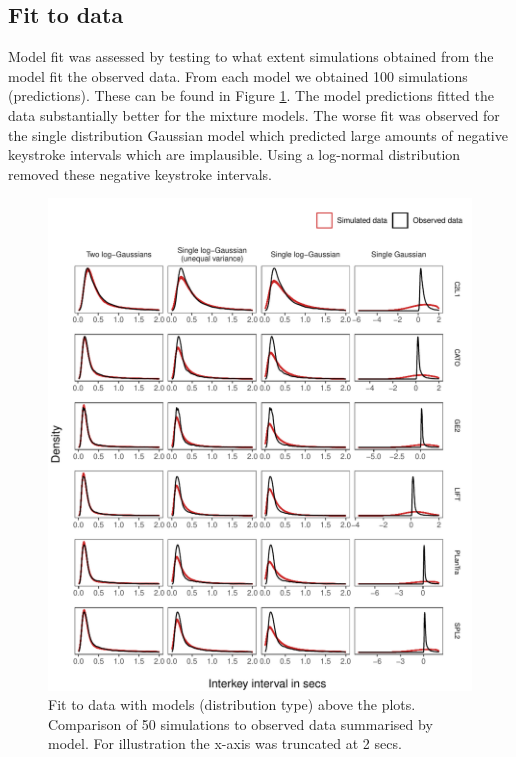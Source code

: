 \documentclass[
  english,
  man,floatsintext]{apa7}
\begin{document}
\clearpage
\makeatletter
\efloat@restorefloats
\makeatother


\begin{appendix}
\section{}
\hypertarget{fit-to-data}{%
\subsection{Fit to data}\label{fit-to-data}}

Model fit was assessed by testing to what extent simulations obtained
from the model fit the observed data. From each model we obtained 100
simulations (predictions). These can be found in Figure
\ref{fig:prediction}. The model predictions fitted the data
substantially better for the mixture models. The worse fit was observed
for the single distribution Gaussian model which predicted large amounts
of negative keystroke intervals which are implausible. Using a
log-normal distribution removed these negative keystroke intervals.

\begin{figure}

{\centering \includegraphics{figures/fitplots} 

}

\caption{Fit to data with models (distribution type) above the plots. Comparison of 50 simulations to observed data summarised by model. For illustration the x-axis was truncated at 2 secs.}\label{fig:prediction}
\end{figure}
\end{appendix}
\end{document}
